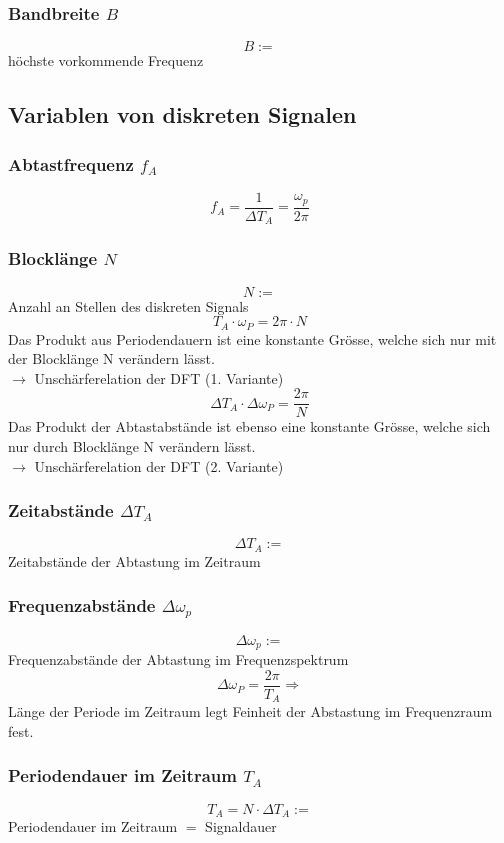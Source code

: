 \documentclass[12pt,a4paper]{scrartcl}
\begin{document}
\subsubsection{Bandbreite $B$}
\label{sec:sub:sub:bandbreite}
$$B :=$$ höchste vorkommende Frequenz

\subsection{Variablen von diskreten Signalen}
\label{sec:sub:const-def-diskrete-signale}

\subsubsection{Abtastfrequenz $f_A$}
\label{sec:sub:sub:abtastfrequenz}
$$f_A = \frac{1}{\Delta T_A} = \frac{\omega_p}{2\pi}$$

\subsubsection{Blocklänge $N$}
\label{sec:sub:sub:blocklaenge}
$$N :=$$ Anzahl an Stellen des diskreten Signals
$$T_A \cdot \omega_P = 2\pi \cdot N$$ Das Produkt aus Periodendauern ist eine konstante Grösse, welche sich nur mit der Blocklänge N verändern lässt.\\
$\to$ Unschärferelation der DFT (1. Variante)
$$\Delta T_A \cdot \Delta \omega_P = \frac{2\pi}{N}$$ Das Produkt der Abtastabstände ist ebenso eine konstante Grösse, welche sich nur durch Blocklänge N verändern lässt.\\
$\to$ Unschärferelation der DFT (2. Variante)

\subsubsection{Zeitabstände $\Delta T_A$}
\label{sec:sub:sub:delta-t-a}
$$\Delta T_A :=$$ Zeitabstände der Abtastung im Zeitraum

\subsubsection{Frequenzabstände $\Delta \omega_p$}
\label{sec:sub:sub:delta-omega-p}
$$\Delta \omega_p :=$$ Frequenzabstände der Abtastung im Frequenzspektrum \\
$$\Delta \omega_P = \frac{2\pi}{T_A} \Rightarrow$$ Länge der Periode im Zeitraum legt Feinheit der Abstastung im Frequenzraum fest.

\subsubsection{Periodendauer im Zeitraum $T_A$}
\label{sec:sub:sub:t-a}
$$T_A = N \cdot \Delta T_A :=$$ Periodendauer im Zeitraum $=$ Signaldauer
\end{document}
